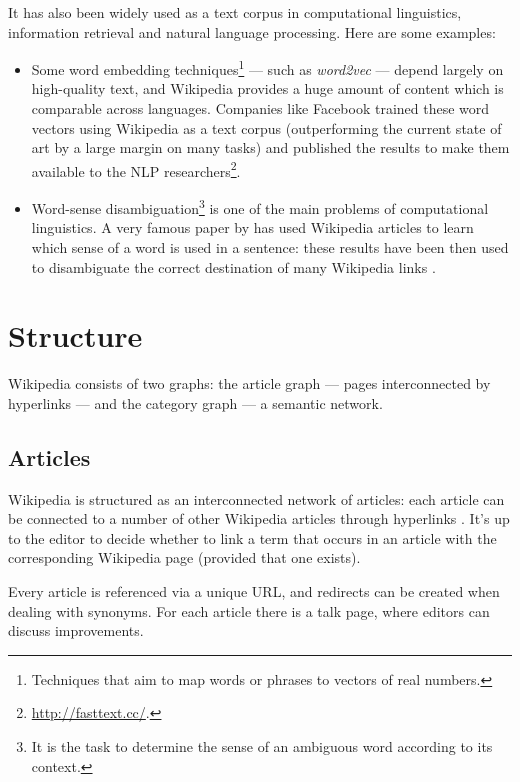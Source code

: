         It has also been widely used as a text corpus in computational linguistics, information retrieval and natural language processing. Here are some examples:
        \begin{itemize}
            \item Some word embedding techniques\footnote{Techniques that aim to map words or phrases to vectors of real numbers.} --- such as \emph{word2vec} \cite{Mikolov} --- depend largely on high-quality text, and Wikipedia provides a huge amount of content which is comparable across languages. Companies like Facebook trained these word vectors using Wikipedia as a text corpus \cite{Grave} (outperforming the current state of art by a large margin on many tasks) and published the results to make them available to the NLP researchers\footnote{\url{http://fasttext.cc/}.}.
            \item Word-sense disambiguation\footnote{It is the task to determine the sense of an ambiguous word according to its context.} is one of the main problems of computational linguistics. A very famous paper by \citeauthor{Milne} has used Wikipedia articles to learn which sense of a word is used in a sentence: these results have been then used to disambiguate the correct destination of many Wikipedia links \cite{Milne}.
        \end{itemize}
    \section{Structure}
        Wikipedia consists of two graphs: the article graph --- pages interconnected by hyperlinks --- and the category graph --- a semantic network.
        \subsection{Articles}
            Wikipedia is structured as an interconnected network of articles: each article can be connected to a number of other Wikipedia articles through hyperlinks \cite{Bellomi}. It's up to the editor to decide whether to link a term that occurs in an article with the corresponding Wikipedia page (provided that one exists).
            
            Every article is referenced via a unique URL, and redirects can be created when dealing with synonyms. For each article there is a talk page, where editors can discuss improvements.
